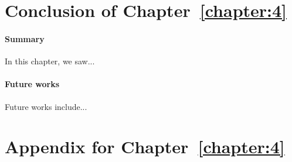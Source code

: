 


\section{Conclusion of Chapter~\ref{chapter:4}}
\label{sec:4:conclusion}


\paragraph{Summary}
In this chapter, we saw...

\paragraph{Future works}
Future works include...


\section{Appendix for Chapter~\ref{chapter:4}}
\label{sec:4:appendix}


